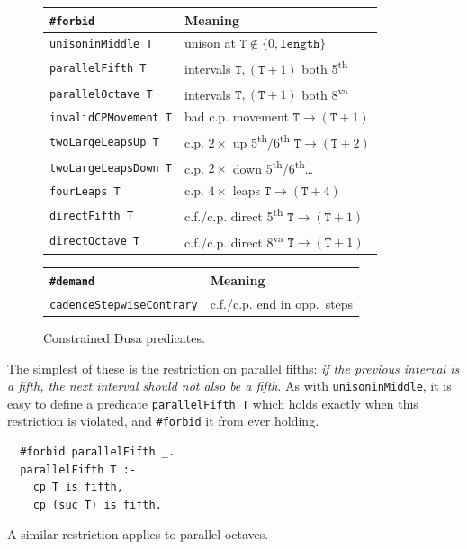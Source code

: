 \begin{figure}
\begin{tabular}{l|l}
\textbf{\texttt{\#forbid}} & \textbf{Meaning} \\ \hline
\verb|unisoninMiddle T| & unison at $\mathtt{T}\not\in\{0,\texttt{length}\}$ \\
\verb|parallelFifth T| & intervals $\mathtt{T},(\mathtt{T}+1)$ both 5\textsuperscript{th} \\
\verb|parallelOctave T| & intervals $\mathtt{T},(\mathtt{T}+1)$ both 8\textsuperscript{va} \\
\verb|invalidCPMovement T| & bad c.p. movement $\mathtt{T}\to(\mathtt{T}+1)$ \\
\verb|twoLargeLeapsUp T| & c.p. $2\times$ up 5\textsuperscript{th}/6\textsuperscript{th} $\mathtt{T}\to(\mathtt{T}+2)$ \\
\verb|twoLargeLeapsDown T| & c.p. $2\times$ down 5\textsuperscript{th}/6\textsuperscript{th}\dots \\
\verb|fourLeaps T| & c.p. $4\times$ leaps $\mathtt{T}\to(\mathtt{T}+4)$ \\
\verb|directFifth T| & c.f./c.p. direct 5\textsuperscript{th} $\mathtt{T}\to(\mathtt{T}+1)$ \\
\verb|directOctave T| & c.f./c.p. direct 8\textsuperscript{va} $\mathtt{T}\to(\mathtt{T}+1)$
\end{tabular}
\bigskip

\begin{tabular}{l|l}
\textbf{\texttt{\#demand}} & \textbf{Meaning} \\ \hline
\verb|cadenceStepwiseContrary| & c.f./c.p. end in opp.\ steps
\end{tabular}
\caption{Constrained Dusa predicates.}
\label{fig:dusa-constraints}
\end{figure}


The simplest of these is the restriction on parallel fifths: \emph{if the previous interval is a fifth, the next interval should not also be a fifth}. As with \verb|unisoninMiddle|, it is easy to define a predicate \verb|parallelFifth T| which holds exactly when this restriction is violated, and \verb|#forbid| it from ever holding.

\begin{verbatim}
  #forbid parallelFifth _.
  parallelFifth T :-
    cp T is fifth,
    cp (suc T) is fifth.
\end{verbatim}

A similar restriction applies to parallel octaves.

